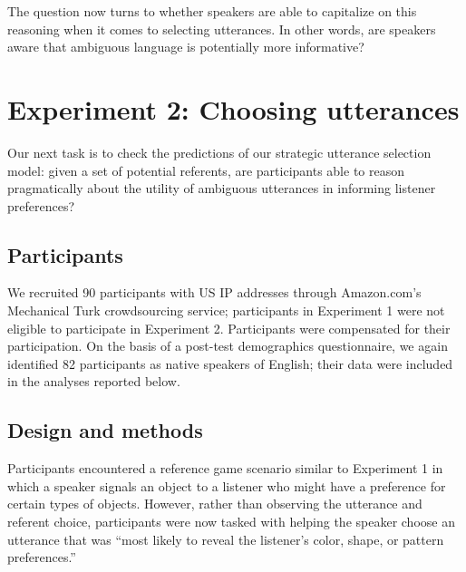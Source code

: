\documentclass[10pt,a4paper]{article}
\begin{document}
The question now turns to whether speakers are able to capitalize on this reasoning when it comes to selecting utterances. In other words, are speakers aware that ambiguous language is potentially more informative?





\section{Experiment 2: Choosing utterances}

Our next task is to check the predictions of our strategic utterance selection model: given a set of potential referents, are participants able to reason pragmatically about the utility of ambiguous utterances in informing listener preferences?

\subsection{Participants}

We recruited 90 participants with US IP addresses through Amazon.com's Mechanical Turk crowdsourcing service; participants in Experiment 1 were not eligible to participate in Experiment 2. Participants were compensated for their participation. On the basis of a post-test demographics questionnaire, we again identified  82 participants as native speakers of English; their data were included in the analyses reported below.

\subsection{Design and methods}

Participants encountered a reference game scenario similar to Experiment 1 in which a speaker signals an object to a listener who might have a preference for certain types of objects. However, rather than observing the utterance and referent choice, participants were now tasked with helping the speaker choose an utterance that was ``most likely to reveal the listener's color, shape, or pattern preferences.''
\end{document}
